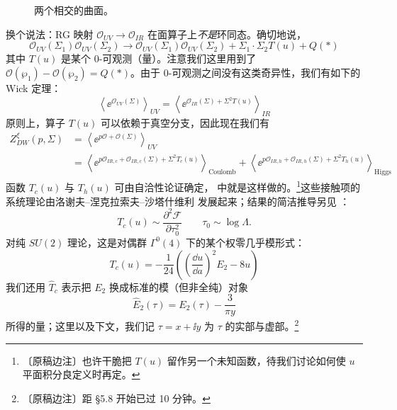 \begin{figure}[H]
  \centering
  \caption{两个相交的曲面。}
  \label{fig:intersectingsurfaces}
\end{figure}

换个说法：RG 映射 $\mathcal{O}_{UV}\to\mathcal{O}_{IR}$ 在面算子上\emph{不是}环同态。确切地说，
\begin{equation}
\mathcal{O}_{UV}(\Sigma_{1})\mathcal{O}_{UV}(\Sigma_{2})
\to\mathcal{O}_{UV}(\Sigma_{1})\mathcal{O}_{UV}(\Sigma_{2})
+\Sigma_{1}\cdot\Sigma_{2}T(u)+Q(\ast)
\tag{5.87}
\end{equation}
其中 $T(u)$ 是某个 0-可观测（量）。注意我们这里用到了 $\mathcal{O}(\wp_{1})-\mathcal{O}(\wp_{2})=Q(\ast)$。由于 0-可观测之间没有这类奇异性，我们有如下的 Wick 定理：
\begin{equation}
\left\langle\ee^{\mathcal{O}_{UV}(\Sigma)}\right\rangle_{UV}
=\left\langle\ee^{\mathcal{O}_{IR}(\Sigma)+\Sigma^{2}T(u)}\right\rangle_{IR}
\tag{5.88}
\end{equation}
原则上，算子 $T(u)$ 可以依赖于真空分支，因此现在我们有
\begin{equation}
\begin{aligned}
Z^{\xi}_{DW}(p,\Sigma)&=\left\langle\ee^{p\mathcal{O}+\mathcal{O}(\Sigma)}\right\rangle_{UV}\\
&=\left\langle\ee^{p\mathcal{O}_{IR,c}+\mathcal{O}_{IR,c}(\Sigma)+\Sigma^{2}T_{c}(u)}\right\rangle_{\text{Coulomb}}
+\left\langle\ee^{p\mathcal{O}_{IR,h}+\mathcal{O}_{IR,h}(\Sigma)+\Sigma^{2}T_{h}(u)}\right\rangle_{\text{Higgs}}
\end{aligned}
\tag{5.89}
\end{equation}
函数 $T_{c}(u)$ 与 $T_{h}(u)$ 可由自洽性论证确定，\cite{ref38} 中就是这样做的。\footnote{〔原稿边注〕也许干脆把 $T(u)$ 留作另一个未知函数，待我们讨论如何使 $u$ 平面积分良定义时再定。}这些接触项的系统理论由洛谢夫--涅克拉索夫--沙塔什维利 \cite{ref26} 发展起来；结果的简洁推导另见 \cite{ref29}：
\begin{equation}
T_{c}(u)\sim\frac{\partial^{2}\mathcal{F}}{\partial\tau_{0}^{2}}
\qquad \tau_{0}\sim\log\Lambda.
\tag{5.90}
\end{equation}
对纯 $SU(2)$ 理论，这是对偶群 $\Gamma^{0}(4)$ 下的某个权零几乎模形式：
\begin{equation}
T_{c}(u)=-\frac{1}{24}\left(\left(\frac{\dd u}{\dd a}\right)^{2}E_{2}-8u\right)
\tag{5.91}
\end{equation}
我们还用 $\hat T_{c}$ 表示把 $E_{2}$ 换成标准的模（但非全纯）对象
\begin{equation}
\hat E_{2}(\tau)=E_{2}(\tau)-\frac{3}{\pi y}
\tag{5.92}
\end{equation}
所得的量；这里以及下文，我们记 $\tau=x+\ii y$ 为 $\tau$ 的实部与虚部。\footnote{〔原稿边注〕距 §5.8 开始已过 10 分钟。}

